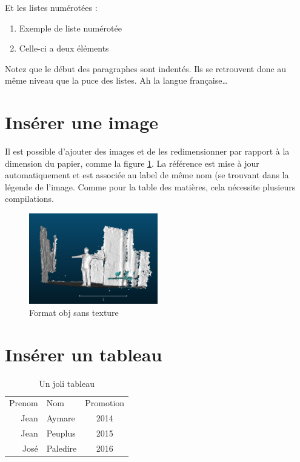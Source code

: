 \documentclass[10pt,a4paper]{report} %
\begin{document}
Et les listes numérotées : 
\begin{enumerate}
	\item Exemple de liste numérotée
	\item Celle-ci a deux éléments
\end{enumerate}
Notez que le début des paragraphes sont indentés. Ils se retrouvent donc au même \og{}niveau\fg{} que la puce des listes. Ah la langue française\dots
\section{Insérer une image}
Il est possible d'ajouter des images et de les redimensionner par rapport à la dimension du papier, comme la figure \ref{format}.
La référence est mise à jour automatiquement et est associée au label de même nom (se trouvant dans la légende de l'image. Comme pour la table des matières, cela nécessite plusieurs compilations.
\begin{figure}[!ht]
	\begin{center}
		\includegraphics[width=0.50\textwidth, keepaspectratio]{images/format.png}
		\caption{Format obj sans texture \label{format}}
	\end{center}
\end{figure}


\section{Insérer un tableau}
\begin{table}[!ht]
	\begin{center}
		\begin{tabular}{rl|c}
			Prenom & Nom      & Promotion \\
			Jean   & Aymare   & 2014      \\
			Jean   & Peuplus  & 2015      \\
			José  & Paledire & 2016      \\
		\end{tabular}
		\caption{Un joli tableau \label{tableau}}
	\end{center}
\end{table}
\end{document}
